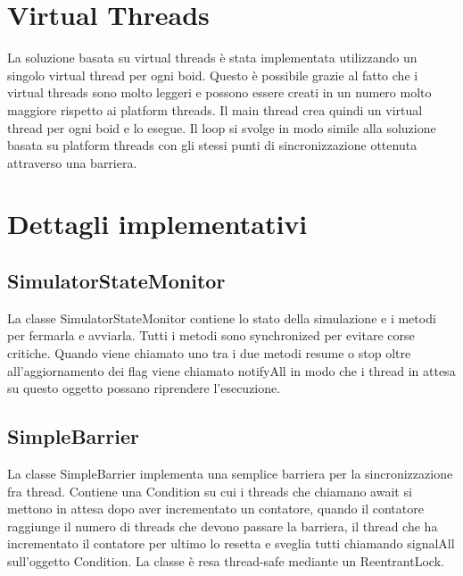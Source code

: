 \documentclass[11pt,notitlepage]{article}
\begin{document}
\section{Virtual Threads}
La soluzione basata su virtual threads è stata implementata utilizzando un singolo virtual thread per ogni boid. Questo è possibile
grazie al fatto che i virtual threads sono molto leggeri e possono essere creati in un numero molto maggiore rispetto ai platform threads.
Il main thread crea quindi un virtual thread per ogni boid e lo esegue. Il loop si svolge in modo simile alla soluzione basata su platform threads con gli stessi punti
di sincronizzazione ottenuta attraverso una barriera.

\section{Dettagli implementativi}
\subsection{SimulatorStateMonitor}
La classe \textsf{SimulatorStateMonitor} contiene lo stato della simulazione e i metodi per fermarla e avviarla. Tutti i metodi sono \textsf{synchronized} per evitare
corse critiche. Quando viene chiamato uno tra i due metodi \textsf{resume} o \textsf{stop} oltre all'aggiornamento dei flag viene chiamato \textsf{notifyAll} in modo
che i thread in attesa su questo oggetto possano riprendere l'esecuzione.

\subsection{SimpleBarrier}
La classe \textsf{SimpleBarrier} implementa una semplice barriera per la sincronizzazione fra thread. Contiene una \textsf{Condition} su cui i threads che chiamano
\textsf{await} si mettono in attesa dopo aver incrementato un contatore, quando il contatore raggiunge il numero di threads che devono passare la barriera, il 
thread che ha incrementato il contatore per ultimo lo resetta e sveglia tutti chiamando \textsf{signalAll} sull'oggetto \textsf{Condition}.
La classe è resa thread-safe mediante un \textsf{ReentrantLock}.
\end{document}
